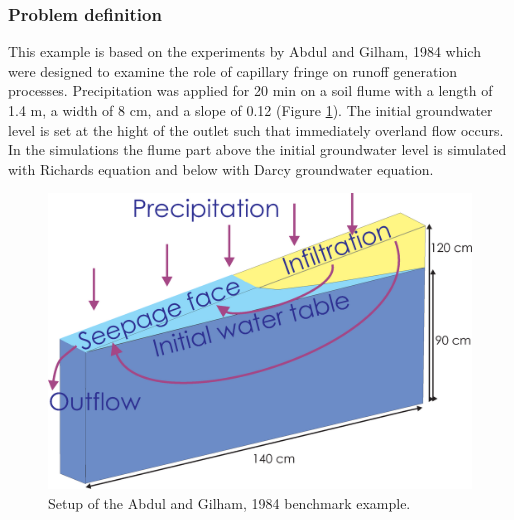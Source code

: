 \subsubsection*{Problem definition}
%
This example is based on the experiments by Abdul and Gilham, 1984 \cite{Abdul:84} which 
were designed to examine the role of capillary fringe on runoff generation processes.
Precipitation was applied for 20 min on a soil flume with a length of 1.4 m, a width of 8 cm, and a slope of 0.12 (Figure \ref{coup:abdulflume}).
The initial groundwater level is set at the hight of the outlet such that immediately overland flow occurs. 
In the simulations the flume part
above the initial groundwater level is simulated with Richards equation and below with Darcy groundwater equation.
%
%
\begin{figure} [htb!]
 \centering
 \includegraphics[width=0.75\columnwidth] {H_COUP/figures/abdulflume.eps}
 \caption{Setup of the Abdul and Gilham, 1984 \cite{Abdul:84} benchmark example.}
 \label{coup:abdulflume}
\end{figure}
%
